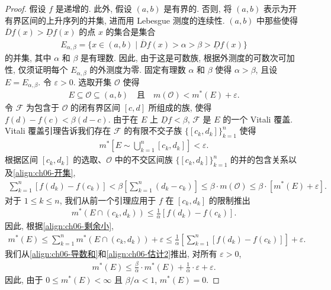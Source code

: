 \documentclass[../../main.tex]{subfiles}
\begin{document}
\begin{proof}
假设 $f$ 是递增的. 此外, 假设 $(a,b)$ 是有界的. 否则, 将 $(a,b)$ 表示为开有界区间的上升序列的并集, 进而用 Lebesgue 测度的连续性. $(a,b)$ 中那些使得 $\overline{D}f(x)>\underline{D}f(x)$ 的点 $x$ 的集合是集合
\begin{align*}
E_{\alpha,\beta}=\{x\in(a,b)\mid\overline{D}f(x)>\alpha>\beta>\underline{D}f(x)\}
\end{align*}
的并集, 其中 $\alpha$ 和 $\beta$ 是有理数. 因此, 由于这是可数族, 根据外测度的可数次可加性, 仅须证明每个 $E_{\alpha,\beta}$ 的外测度为零. 固定有理数 $\alpha$ 和 $\beta$ 使得 $\alpha>\beta$, 且设 $E=E_{\alpha,\beta}$. 令 $\varepsilon>0$. 选取开集 $\mathcal{O}$ 使得
\begin{align}
E\subseteq\mathcal{O}\subseteq(a,b)\quad\text{且}\quad m(\mathcal{O})<m^{*}(E)+\varepsilon.\label{align:ch06-开集}
\end{align}
令 $\mathcal{F}$ 为包含于 $\mathcal{O}$ 的闭有界区间 $[c,d]$ 所组成的族, 使得 $f(d)-f(c)<\beta(d-c)$. 由于在 $E$ 上 $\underline{D}f<\beta$, $\mathcal{F}$ 是 $E$ 的一个 Vitali 覆盖. Vitali 覆盖引理告诉我们存在 $\mathcal{F}$ 的有限不交子族 $\{[c_{k},d_{k}]\}_{k=1}^{n}$ 使得
\begin{align}
m^{*}\left[E\sim\bigcup_{k=1}^{n}[c_{k},d_{k}]\right]<\varepsilon.\label{align:ch06-剩余小}
\end{align}
根据区间 $[c_{k},d_{k}]$ 的选取、$\mathcal{O}$ 中的不交区间族 $\{[c_{k},d_{k}]\}_{k=1}^{n}$ 的并的包含关系以及\eqref{align:ch06-开集},
\begin{align}
\sum_{k=1}^{n}[f(d_{k})-f(c_{k})]<\beta\left[\sum_{k=1}^{n}(d_{k}-c_{k})\right]\leqslant\beta\cdot m(\mathcal{O})\leqslant\beta\cdot[m^{*}(E)+\varepsilon].\label{align:ch06-导数和}
\end{align}
对于 $1\leqslant k\leqslant n$, 我们从前一个引理应用于 $f$ 在 $[c_{k},d_{k}]$ 的限制推出
\begin{align*}
m^{*}(E\cap(c_{k},d_{k}))\leqslant\frac{1}{\alpha}[f(d_{k})-f(c_{k})].
\end{align*}
因此, 根据\eqref{align:ch06-剩余小},
\begin{align}
m^{*}(E)\leqslant\sum_{k=1}^{n}m^{*}(E\cap(c_{k},d_{k}))+\varepsilon\leqslant\frac{1}{\alpha}\left[\sum_{k=1}^{n}[f(d_{k})-f(c_{k})]\right]+\varepsilon.\label{align:ch06-估计2}
\end{align}
我们从\eqref{align:ch06-导数和}和\eqref{align:ch06-估计2}推出, 对所有 $\varepsilon>0$,
\begin{align*}
m^{*}(E)\leqslant\frac{\beta}{\alpha}\cdot m^{*}(E)+\frac{1}{\alpha}\cdot\varepsilon+\varepsilon.
\end{align*}
因此, 由于 $0\leqslant m^{*}(E)<\infty$ 且 $\beta/\alpha<1$, $m^{*}(E)=0$.
\end{proof}
\end{document}
